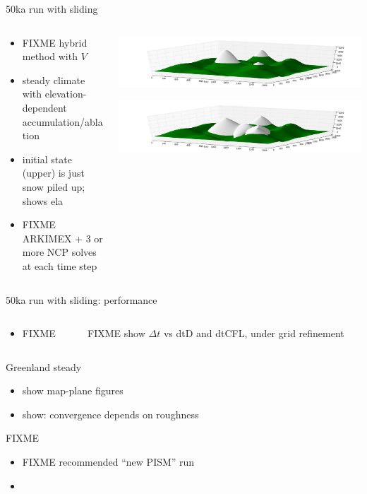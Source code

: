 \documentclass[hide notes,intlimits,usenames,dvipsnames]{beamer}
\begin{document}
\begin{frame}{50ka run with sliding}
\begin{columns}
\begin{column}{0.4\textwidth}
\begin{itemize}
\item FIXME hybrid method with $V$
\item steady climate with elevation-dependent accumulation/ablation
\item initial state (upper) is just snow piled up; shows ela
\item FIXME ARKIMEX + $3$ or more NCP solves at each time step
\end{itemize}
\end{column}
\begin{column}{0.6\textwidth}
\includegraphics[width=\textwidth]{startsheet.png}

\includegraphics[width=\textwidth]{endsheet.png}
\end{column}
\end{columns}
\end{frame}

\begin{frame}{50ka run with sliding: performance}
\begin{columns}
\begin{column}{0.4\textwidth}
\begin{itemize}
\item FIXME
\end{itemize}
\end{column}
\begin{column}{0.6\textwidth}
FIXME  show $\Delta t$ vs dtD and dtCFL, under grid refinement
\end{column}
\end{columns}
\end{frame}


\begin{frame}{Greenland steady}
\begin{itemize}
\item show map-plane figures
\item show: convergence depends on roughness
\end{itemize}
\end{frame}


\begin{frame}{FIXME}
\begin{itemize}
\item FIXME recommended ``new PISM'' run
\item 
\end{itemize}
\end{frame}
\end{document}
